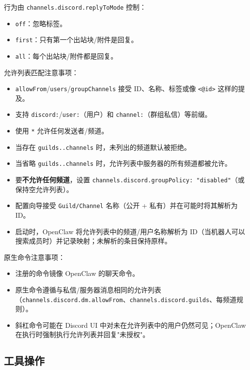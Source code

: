 行为由 \texttt{channels.discord.replyToMode} 控制：

\begin{itemize}
  \item \texttt{off}：忽略标签。
  \item \texttt{first}：只有第一个出站块/附件是回复。
  \item \texttt{all}：每个出站块/附件都是回复。
\end{itemize}


允许列表匹配注意事项：

\begin{itemize}
  \item \texttt{allowFrom}/\texttt{users}/\texttt{groupChannels} 接受 ID、名称、标签或像 \texttt{<@id>} 这样的提及。
  \item 支持 \texttt{discord:}/\texttt{user:}（用户）和 \texttt{channel:}（群组私信）等前缀。
  \item 使用 \texttt{*} 允许任何发送者/频道。
  \item 当存在 \texttt{guilds..channels} 时，未列出的频道默认被拒绝。
  \item 当省略 \texttt{guilds..channels} 时，允许列表中服务器的所有频道都被允许。
  \item 要\textbf{不允许任何频道}，设置 \texttt{channels.discord.groupPolicy: "disabled"}（或保持空允许列表）。
  \item 配置向导接受 \texttt{Guild/Channel} 名称（公开 + 私有）并在可能时将其解析为 ID。
  \item 启动时，OpenClaw 将允许列表中的频道/用户名称解析为 ID（当机器人可以搜索成员时）并记录映射；未解析的条目保持原样。
\end{itemize}


原生命令注意事项：

\begin{itemize}
  \item 注册的命令镜像 OpenClaw 的聊天命令。
  \item 原生命令遵循与私信/服务器消息相同的允许列表（\texttt{channels.discord.dm.allowFrom}、\texttt{channels.discord.guilds}、每频道规则）。
  \item 斜杠命令可能在 Discord UI 中对未在允许列表中的用户仍然可见；OpenClaw 在执行时强制执行允许列表并回复"未授权"。
\end{itemize}


\subsection{工具操作}


